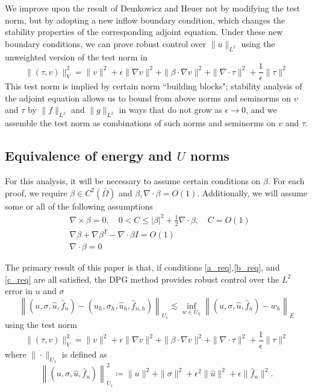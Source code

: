 \documentclass[11pt,onecolumn]{scrartcl}
\newcommand{\grad}{\nabla}
\newcommand{\curl}{\grad \times}
\renewcommand{\div}{\grad \cdot}
\begin{document}
We improve upon the result of Demkowicz and Heuer not by modifying the test norm, but by adopting a new inflow boundary condition, which changes the stability properties of the corresponding adjoint equation. Under these new boundary conditions, we can prove robust control over $\|u\|_{L^2}$ using the unweighted version of the test norm in \cite{DPGrobustness}
\[
\|\left(\tau, v\right)\|_{V}^2 = \|v\|^2 + \epsilon \|\grad v\|^2 + \|\beta \cdot \grad v\|^2 + \| \div \tau\|^2 + \frac{1}{\epsilon}\|\tau\|^2
\]
This test norm is implied by certain norm ``building blocks"; stability analysis of the adjoint equation allows us to bound from above norms and seminorms on $v$ and $\tau$ by $\|f\|_{L^2}$ and $\|g\|_{L^2}$ in ways that do not grow as $\epsilon \rightarrow 0$, and we assemble the test norm as combinations of such norms and seminorms on $v$ and $\tau$.  

\subsection{Equivalence of energy and $U$ norms}

For this analysis, it will be necessary to assume certain conditions on $\beta$.  For each proof, we require $\beta \in C^2(\bar{\Omega})$ and $\beta, \div \beta = O(1)$.  Additionally, we will assume some or all of the following assumptions
\begin{align}
&\curl \beta = 0, \quad 0<C \leq \left | \beta\right |^2 + \frac{1}{2}\div \beta, \quad C = O(1) \label{a_req}\\
&\grad \beta + \grad \beta ^T - \div \beta I = O(1) \label{b_req}\\
&\div \beta = 0 \label{c_req}
\end{align}

The primary result of this paper is that, if conditions \ref{a_req},\ref{b_req}, and \ref{c_req} are all satisfied, the DPG method provides robust control over the $L^2$ error in $u$ and $\sigma$
\[
\left\|\left(u,\sigma,\widehat{u},\widehat{f}_n\right)-\left(u_h,\sigma_h,\widehat{u}_h,\widehat{f}_{n,h}\right)\right\|_{U_1} \lesssim \inf_{w\in U_h}\left\|\left(u,\sigma,\widehat{u},\widehat{f}_n\right)-w_h \right\|_{E}
\]
using the test norm
\[
\|\left(\tau, v\right)\|_{V}^2 = \|v\|^2 + \epsilon \|\grad v\|^2 + \|\beta \cdot \grad v\|^2 + \| \div \tau\|^2 + \frac{1}{\epsilon}\|\tau\|^2
\]
where $\|\cdot \|_{U_1}$ is defined as
\[
\left\|\left(u,\sigma,\widehat{u},\widehat{f}_n\right)\right\|_{U_1}^2 \coloneqq \|u\|^2 + \|\sigma\|^2 + \epsilon^2\|\widehat{u}\|^2+\epsilon \|\widehat{f}_n\|^2.
\]
\end{document}
